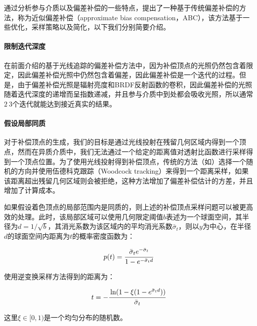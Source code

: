 通过分析参与介质以及偏差补偿的一些特点，\cite{a:ApproximateBiasCompensationforRenderingSceneswithHeterogeneousParticipatingMedia}提出了一种基于传统偏差补偿的方法，称为近似偏差补偿（approximate bias compensation，ABC），该方法基于一些优化，采样策略以及简化，以下我们分别简要介绍。



\paragraph{限制迭代深度}
在前面介绍的基于光线追踪的偏差补偿方法中，因为补偿顶点的光照仍然包含着限定，因此偏差补偿光照中仍然包含着偏差，因此偏差补偿是一个迭代的过程。但是，由于偏差补偿光照是辐射亮度和BRDF反射函数的卷积，因此偏差补偿的光照随着迭代深度的递增而呈指数递减，并且参与介质中到处都会吸收光照，所以通常$2~3$个迭代就能达到接近真实的结果。



\paragraph{假设局部同质}
对于补偿顶点的生成，我们的目标是通过光线投射在残留几何区域内得到一个顶点，然而在异质介质中，我们无法通过一个给定的距离值对透射比函数进行采样得到一个顶点位置。为了使用光线投射得到补偿顶点，传统的方法（如\cite{a:UnbiasedGlobalIlluminationwithParticipatingMedia}）选择一个随机的方向并使用伍德科克跟踪（Woodcock tracking）来得到一个距离采样，如果该距离超出残留几何区域则会被拒绝，这种方法增加了偏差补偿估计的方差，并且增加了计算成本。

如果假设着色顶点的局部范围内是同质的，则上述的补偿顶点采样问题可以被更高效的处理。此时，该局部区域可以使用几何限定阈值$b$表述为一个球面空间，其半径为$d=1/\sqrt{{b}}$，其消光系数为该区域内的平均消光系数$\bar{\sigma}_t$，则以$y$为中心，在半径$d$的球面空间内距离为$t$的概率密度函数为：

\begin{equation}
	p(t)= \cfrac{\bar{\sigma}_t e^{-\bar{\sigma}_t}}{1-e^{-\bar{\sigma}_t d}}
\end{equation}

\noindent 使用逆变换采样方法得到的距离为：

\begin{equation}
	t=- \cfrac{\ln(1-\xi(1-e^{\bar{\sigma}_td}))}{\bar{\sigma}_t}
\end{equation}

\noindent 这里$\xi\in[0,1)$是一个均匀分布的随机数。

